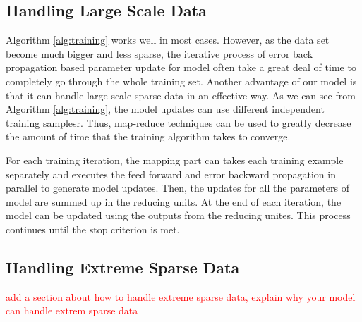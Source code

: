\subsection{Handling Large Scale  Data}
Algorithm \ref{alg:training} works well in most cases. However, as the
data set become much bigger and less sparse, the iterative process of
error back propagation based parameter update for {\sppan} model often
take a great deal of time to completely go through the whole training
set.  Another advantage of our model is that it can handle large scale
sparse data in an effective way. As we can see from Algorithm
\ref{alg:training}, the {\sppan} model updates can use different
independent training samplesr. Thus, map-reduce techniques can be used
to greatly decrease the amount of time that the training algorithm
takes to converge.

For each training iteration, the mapping part can takes each training
example separately and executes the feed forward and error backward
propagation in parallel to generate model updates. Then, the updates
for all the parameters of {\sppan} model are summed up in the reducing
units. At the end of each iteration, the {\sppan} model can be updated
using the outputs from the reducing unites. This process continues
until the stop criterion is met.


\subsection{Handling Extreme Sparse Data}

\textcolor{red}{add a section about how to handle extreme sparse data,
  explain why your model can handle extrem sparse data}
